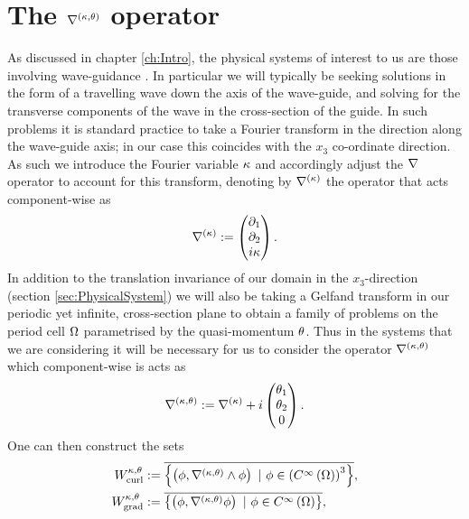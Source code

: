 \section{The $\nabla^{\left( \kappa, \theta \right)}$ operator} \label{sec:ktOperator}
As discussed in chapter \ref{ch:Intro}, the physical systems of interest to us are those involving wave-guidance .
In particular we will typically be seeking solutions in the form of a travelling wave down the axis of the wave-guide, and solving for the transverse components of the wave in the cross-section of the guide.
In such problems it is standard practice to take a Fourier transform in the direction along the wave-guide axis; in our case this coincides with the $x_3$ co-ordinate direction.
As such we introduce the Fourier variable $\kappa$ and accordingly adjust the $\nabla$ operator to account for this transform, denoting by $\nabla^{(\kappa)}$ the operator that acts component-wise as
\begin{align*}
	\nabla^{(\kappa)} := \begin{pmatrix} \partial_1 \\ \partial_2 \\ i\kappa\end{pmatrix}.
\end{align*}
In addition to the translation invariance of our domain in the $x_3$-direction (section \ref{sec:PhysicalSystem})  we will also be taking a Gelfand transform in our periodic yet infinite, cross-section plane to obtain a family of problems on the period cell $\Omega$ parametrised by the quasi-momentum $\theta$.
Thus in the systems that we are considering it will be necessary for us to consider the operator $\nabla^{\left( \kappa, \theta \right)}$ which component-wise is acts as
\begin{align*}
	\nabla^{\left( \kappa, \theta \right)} := \nabla^{(\kappa)} + i\begin{pmatrix} \theta_1 \\ \theta_2 \\ 0 \end{pmatrix}.
\end{align*}
One can then construct the sets
\begin{subequations} \label{eq:WktDefinitions}
	\begin{align}
		W^{\wavenumber, \qm}_{\mathrm{curl}} &:= \overline{ \clbracs{ \bracs{\phi, \ktcurl{}\phi} \ \vert \ \phi\in\bracs{\smooth{\ddom}}^3 } }, \\
		W^{\wavenumber, \qm}_{\mathrm{grad}} &:= \overline{ \clbracs{ \bracs{\phi, \ktgrad\phi} \ \vert \ \phi\in\smooth{\ddom} } },
	\end{align}
\end{subequations}
